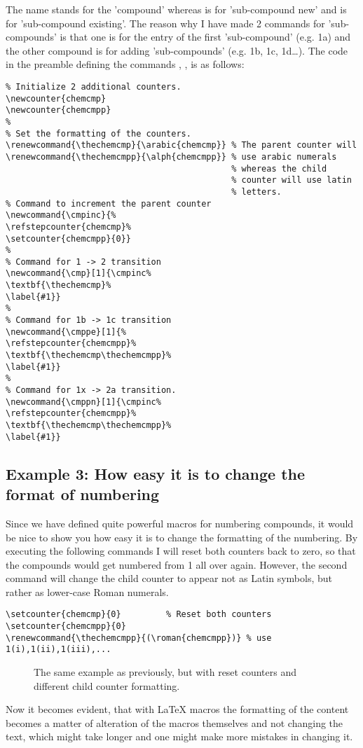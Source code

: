 \documentclass[
]{scrartcl}
\begin{document}
%
The  name stands for the 'compound' whereas  is for
    'sub-compound new' and  is for 'sub-compound existing'. 
%
The reason why I have made 2 commands for 'sub-compounds' is that one is for the
    entry of the first 'sub-compound' (e.g. 1a) and the other compound is for
    adding 'sub-compounds' (e.g. 1b, 1c, 1d\ldots).
%
The code in the preamble defining the commands , ,
     is as follows:
\begin{lstlisting}
% Initialize 2 additional counters.
\newcounter{chemcmp}
\newcounter{chemcmpp}
%
% Set the formatting of the counters.
\renewcommand{\thechemcmp}{\arabic{chemcmp}} % The parent counter will
\renewcommand{\thechemcmpp}{\alph{chemcmpp}} % use arabic numerals
                                             % whereas the child
                                             % counter will use latin
                                             % letters.
% Command to increment the parent counter
\newcommand{\cmpinc}{%
\refstepcounter{chemcmp}%
\setcounter{chemcmpp}{0}}
%
% Command for 1 -> 2 transition
\newcommand{\cmp}[1]{\cmpinc%
\textbf{\thechemcmp}%
\label{#1}}
%
% Command for 1b -> 1c transition
\newcommand{\cmppe}[1]{%
\refstepcounter{chemcmpp}%
\textbf{\thechemcmp\thechemcmpp}%
\label{#1}}
%
% Command for 1x -> 2a transition.
\newcommand{\cmppn}[1]{\cmpinc%
\refstepcounter{chemcmpp}%
\textbf{\thechemcmp\thechemcmpp}%
\label{#1}}
\end{lstlisting}

%
\subsection{Example 3: How easy it is to change the format of numbering}

%
Since we have defined quite powerful macros for numbering compounds, it would
    be nice to show you how easy it is to change the formatting of the
    numbering.
%
By executing the following commands I will reset both counters back to zero, so
    that the compounds would get numbered from 1 all over again.
%
However, the second command will change the child counter to appear not as
    Latin symbols, but rather as lower-case Roman numerals.
\begin{lstlisting}
\setcounter{chemcmp}{0}         % Reset both counters
\setcounter{chemcmpp}{0}
\renewcommand{\thechemcmpp}{(\roman{chemcmpp})} % use 1(i),1(ii),1(iii),...
\end{lstlisting}
\setcounter{chemcmp}{0}
\setcounter{chemcmpp}{0}
\renewcommand{\thechemcmpp}{(\roman{chemcmpp})} %

%
\begin{figure}[h]
    \centering
    
    \caption{
        The same example as previously, but with reset counters and different
            child counter formatting.
        }
    \label{fig:compeggg}
\end{figure}

%
Now it becomes evident, that with \LaTeX{} macros the formatting of the content
    becomes a matter of alteration of the macros themselves and not changing the
    text, which might take longer and one might make more mistakes in changing
    it.

%
\end{document}
